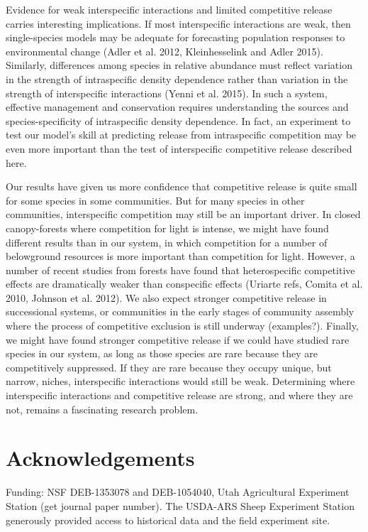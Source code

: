 \documentclass[11pt]{article}
\begin{document}
\begin{doublespacing}
Evidence for weak interspecific interactions and limited competitive release carries interesting implications. If most interspecific interactions are weak, then single-species models may be adequate for forecasting population responses to environmental change (Adler et al. 2012, Kleinhesselink and Adler 2015). Similarly, differences among species in relative abundance must reflect variation in the strength of intraspecific density dependence rather than variation in the strength of interspecific interactions (Yenni et al. 2015). In such a system, effective management and conservation requires understanding the sources and species-specificity of intraspecific density dependence. In fact, an experiment to test our model's skill at predicting release from intraspecific competition may be even more important than the test of interspecific competitive release described here.

Our results have given us more confidence that competitive release is quite small for some species in some communities. But for many species in other communities, interspecific competition may still be an important driver. In closed canopy-forests where competition for light is intense, we might have found different results than in our system, in which competition for a number of belowground resources is more important than competition for light. However, a number of recent studies from forests have found that heterospecific competitive effects are dramatically weaker than conspecific effects (Uriarte refs, Comita et al. 2010, Johnson et al. 2012). We also expect stronger competitive release in successional systems, or communities in the early stages of community assembly where the process of competitive exclusion is still underway (examples?). Finally, we might have found stronger competitive release if we could have studied rare species in our system, as long as those species are rare because they are competitively suppressed. If they are rare because they occupy unique, but narrow, niches, interspecific interactions would still be weak.  Determining where interspecific interactions and competitive release are strong, and where they are not, remains a fascinating research problem.

\section*{Acknowledgements}

Funding: NSF DEB-1353078 and DEB-1054040, Utah Agricultural Experiment Station (get journal paper number). The USDA-ARS Sheep Experiment Station generously provided access to historical data and the field experiment site.

\newpage




\end{doublespacing} 
\end{document}
